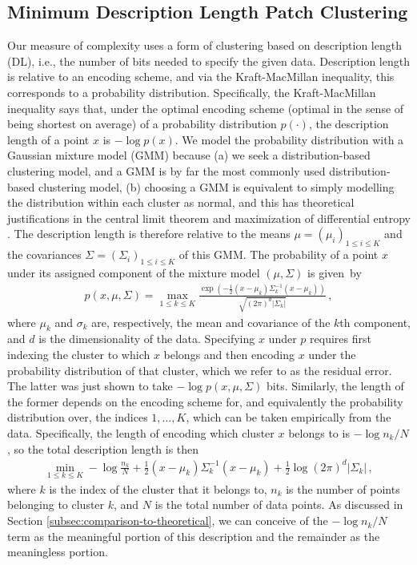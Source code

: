 \documentclass[a4paper,fleqn]{cas-sc}
\theoremstyle{remark}
\begin{document}
\subsection{Minimum Description Length Patch Clustering}
Our measure of complexity uses a form of clustering based on description length (DL), i.e., the number of bits needed to specify the given data. Description length is relative to an encoding scheme, and via the Kraft-MacMillan inequality, this corresponds to a probability distribution. Specifically, the Kraft-MacMillan inequality says that, under the optimal encoding scheme (optimal in the sense of being shortest on average) of a probability distribution $p(\cdot)$, the description length of a point $x$ is $-\log p(x)$. We model the probability distribution with a Gaussian mixture model (GMM) because (a) we seek a distribution-based clustering model, and a GMM is by far the most commonly used distribution-based clustering model, (b) choosing a GMM is equivalent to simply modelling the distribution within each cluster as normal, and this has theoretical justifications in the central limit theorem and maximization of differential entropy \citep{thomas2006elements}. The description length is therefore relative to the means $\mu = (\mu_i)_{1 \leq i \leq K}$ and the covariances $\Sigma = (\Sigma_i)_{1 \leq i \leq K}$ of this GMM. The probability of a point $x$ under its assigned component of the mixture model $(\mu,\Sigma)$ is given~by
\begin{align} \label{eq:MVN-prob}
    p(x, \mu, \Sigma) = \max_{1 \leq k \leq K} \frac{\exp(-\tfrac{1}{2}(x- \mu_{k})\Sigma_{k}^{-1}(x-\mu_{k}))}{\sqrt{(2 \pi)^{d}|\Sigma_{k}|}}\,,
\end{align}
where $\mu_k$ and $\sigma_k$ are, respectively, the mean and covariance of the $k$th component, and $d$ is the dimensionality of the data. Specifying $x$ under $p$ requires first indexing the cluster to which $x$ belongs and then encoding $x$ under the probability distribution of that cluster, which we refer to as the residual error. The latter was just shown to take $-\log p(x, \mu, \Sigma)$ bits. Similarly, the length of the former depends on the encoding scheme for, and equivalently the probability distribution over, the indices $1, \dots, K$, which can be taken empirically from the data. Specifically, the length of encoding which cluster $x$ belongs to is $-\log {n_k}/{N}$, so the total description length is then 
\begin{align} \label{eq:MVN-DL}
    \min_{1 \leq k \leq K} -\log \tfrac{n_k}{N} + \tfrac{1}{2}(x- \mu_{k})\Sigma_{k}^{-1}(x-\mu_{k}) + \tfrac{1}{2}\log{(2 \pi)^{d}|\Sigma_{k}|}\,,
\end{align}
where $k$ is the index of the cluster that it belongs to, $n_k$ is the number of points belonging to cluster $k$, and $N$ is the total number of data points. As discussed in Section \ref{subsec:comparison-to-theoretical}, we can conceive of the $-\log {n_k}/{N}$ term as the meaningful portion of this description and the remainder as the meaningless portion.
\end{document}
